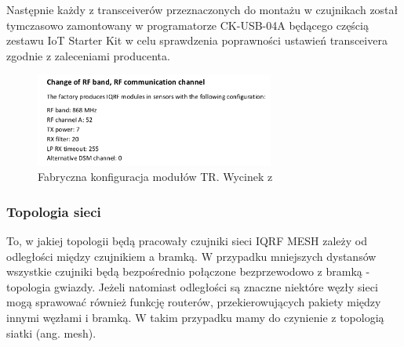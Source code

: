 Następnie każdy z transceiverów przeznaczonych do montażu w czujnikach został tymczasowo zamontowany w programatorze CK-USB-04A będącego częścią
zestawu IoT Starter Kit w celu sprawdzenia poprawności ustawień transceivera zgodnie z zaleceniami producenta.

\begin{figure}[H]
    \centering
    \includegraphics[width=0.7\textwidth]{zdj/protronix-settings.png}
    \caption{Fabryczna konfiguracja modułów TR. Wycinek z \cite{protronix-comms}}
\end{figure}

\subsubsection{Topologia sieci}

To, w jakiej topologii będą pracowały czujniki sieci IQRF MESH zależy od odległości między czujnikiem a bramką. W przypadku 
mniejszych dystansów wszystkie czujniki będą bezpośrednio połączone bezprzewodowo z bramką - topologia gwiazdy. Jeżeli natomiast
odległości są znaczne niektóre węzły sieci mogą sprawować również funkcję routerów, przekierowujących pakiety między innymi 
węzłami i bramką. W takim przypadku mamy do czynienie z topologią siatki (ang. mesh).

